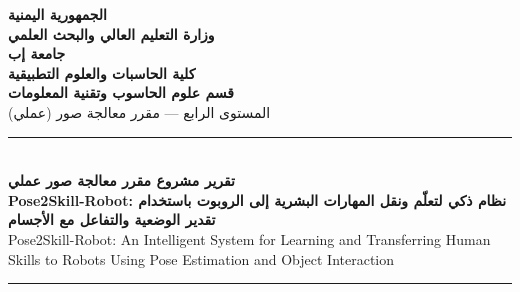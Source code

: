 \documentclass[11pt,a4paper]{article}
\begin{document}
\begin{titlepage}
    \centering
    \vspace*{0.2cm}
    
    {\large \textbf{الجمهورية اليمنية}} \\
    \vspace{0.15cm}
    {\large \textbf{وزارة التعليم العالي والبحث العلمي}} \\
    \vspace{0.15cm}
    {\Large \textbf{جامعة إب}} \\
    \vspace{0.15cm}
    {\large \textbf{كلية الحاسبات والعلوم التطبيقية}} \\
    \vspace{0.15cm}
    {\normalsize \textbf{قسم علوم الحاسوب وتقنية المعلومات}} \\
    \vspace{0.15cm}
    {\small المستوى الرابع --- مقرر معالجة صور (عملي)} \\
    
    \vspace{2.2cm}
    \rule{\linewidth}{1.2pt} \\
    \vspace{0.5cm}
    {\large \textbf{تقرير مشروع مقرر معالجة صور عملي}} \\
    \vspace{0.4cm}
    {\huge \textbf{Pose2Skill-Robot: نظام ذكي لتعلّم ونقل المهارات البشرية إلى الروبوت باستخدام تقدير الوضعية والتفاعل مع الأجسام}} \\
    \vspace{0.4cm}
    {\large \textenglish{Pose2Skill-Robot: An Intelligent System for Learning and Transferring Human Skills to Robots Using Pose Estimation and Object Interaction}} \\
    \vspace{0.5cm}
    \rule{\linewidth}{1.2pt} \\
    
    \vspace{2.2cm}
    

\end{titlepage}
\end{document}
